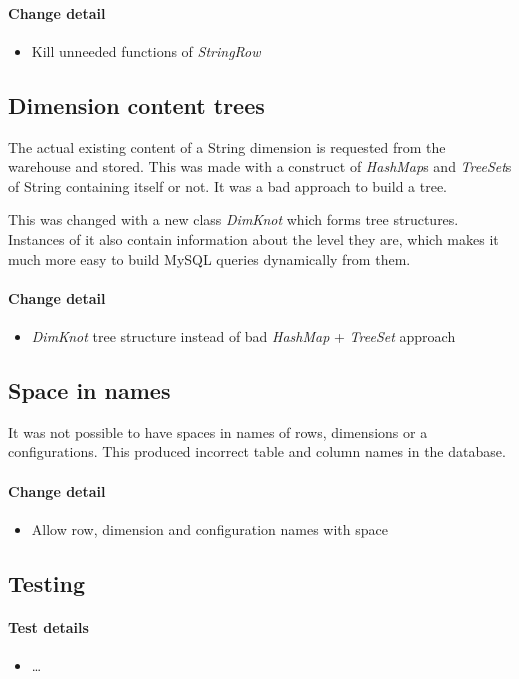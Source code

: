 \paragraph{Change detail}
\begin{itemize}
  \item Kill unneeded functions of \textit{StringRow}
\end{itemize}

\subsection{Dimension content trees}
The actual existing content of a String dimension is requested from
the warehouse and stored. This was made with a construct
of \textit{HashMap}s and \textit{TreeSet}s of String containing itself or not. It was
a bad approach to build a tree.

This was changed with a new class \textit{DimKnot} which forms tree structures. 
Instances of it also contain information about the level they are,
which makes it much more easy to build MySQL queries dynamically from them.
\paragraph{Change detail}
\begin{itemize}
  \item \textit{DimKnot} tree structure instead of bad \textit{HashMap} + \textit{TreeSet} approach
\end{itemize}

\subsection{Space in names}
It was not possible to have spaces in names of rows, dimensions or a configurations. This
produced incorrect table and column names in the database.
\paragraph{Change detail}
\begin{itemize}
  \item Allow row, dimension and configuration names with space
\end{itemize}

\subsection{Testing}

\paragraph{Test details}
\begin{itemize}
  \item \ldots
\end{itemize}

